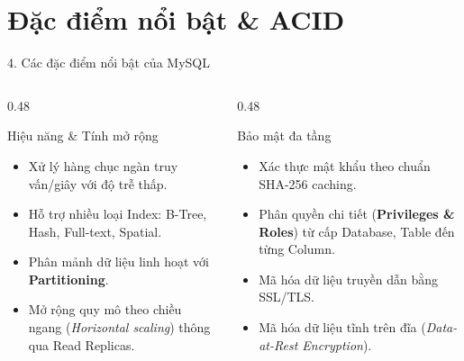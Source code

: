\documentclass[aspectratio=169,11pt]{beamer}
\newcommand{\kw}[1]{\textcolor{dbblue}{\textbf{#1}}}
\begin{document}
\section{Đặc điểm nổi bật \& ACID}
\begin{frame}{4. Các đặc điểm nổi bật của MySQL}
\begin{columns}[t]
  \begin{column}{0.48\textwidth}
    \begin{block}{Hiệu năng \& Tính mở rộng}
      \begin{itemize}\footnotesize
        \item Xử lý hàng chục ngàn truy vấn/giây với độ trễ thấp.
        \item Hỗ trợ nhiều loại Index: B-Tree, Hash, Full-text, Spatial.
        \item Phân mảnh dữ liệu linh hoạt với \kw{Partitioning}.
        \item Mở rộng quy mô theo chiều ngang (\textit{Horizontal scaling}) thông qua Read Replicas.
      \end{itemize}
    \end{block}
  \end{column}
  \begin{column}{0.48\textwidth}
    \begin{block}{Bảo mật đa tầng}
      \begin{itemize}\footnotesize
        \item Xác thực mật khẩu theo chuẩn SHA-256 caching.
        \item Phân quyền chi tiết (\kw{Privileges \& Roles}) từ cấp Database, Table đến từng Column.
        \item Mã hóa dữ liệu truyền dẫn bằng SSL/TLS.
        \item Mã hóa dữ liệu tĩnh trên đĩa (\textit{Data-at-Rest Encryption}).
      \end{itemize}
    \end{block}
  \end{column}
\end{columns}
\end{frame}
\end{document}
